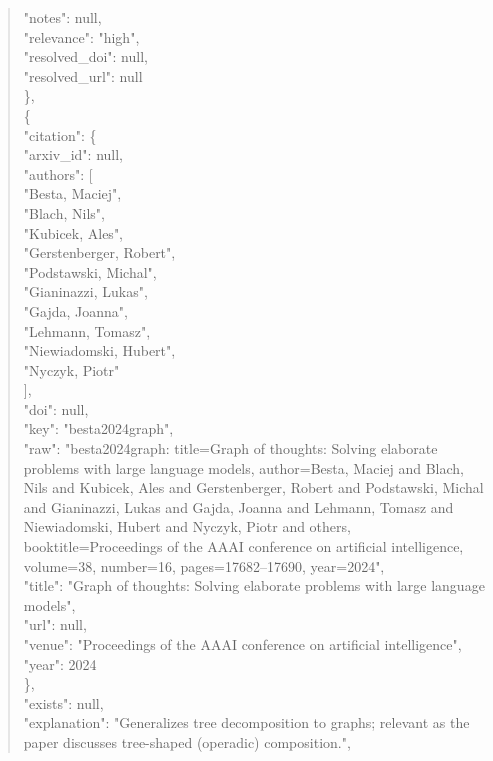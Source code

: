 \documentclass[11pt]{article}
\begin{document}
\begin{quote}
      "notes": null,\\
      "relevance": "high",\\
      "resolved\_doi": null,\\
      "resolved\_url": null\\
    \},\\
    \{\\
      "citation": \{\\
        "arxiv\_id": null,\\
        "authors": [\\
          "Besta, Maciej",\\
          "Blach, Nils",\\
          "Kubicek, Ales",\\
          "Gerstenberger, Robert",\\
          "Podstawski, Michal",\\
          "Gianinazzi, Lukas",\\
          "Gajda, Joanna",\\
          "Lehmann, Tomasz",\\
          "Niewiadomski, Hubert",\\
          "Nyczyk, Piotr"\\
        ],\\
        "doi": null,\\
        "key": "besta2024graph",\\
        "raw": "besta2024graph: title=Graph of thoughts: Solving elaborate problems with large language models, author=Besta, Maciej and Blach, Nils and Kubicek, Ales and Gerstenberger, Robert and Podstawski, Michal and Gianinazzi, Lukas and Gajda, Joanna and Lehmann, Tomasz and Niewiadomski, Hubert and Nyczyk, Piotr and others, booktitle=Proceedings of the AAAI conference on artificial intelligence, volume=38, number=16, pages=17682--17690, year=2024",\\
        "title": "Graph of thoughts: Solving elaborate problems with large language models",\\
        "url": null,\\
        "venue": "Proceedings of the AAAI conference on artificial intelligence",\\
        "year": 2024\\
      \},\\
      "exists": null,\\
      "explanation": "Generalizes tree decomposition to graphs; relevant as the paper discusses tree-shaped (operadic) composition.",\\

\end{quote}
\end{document}
